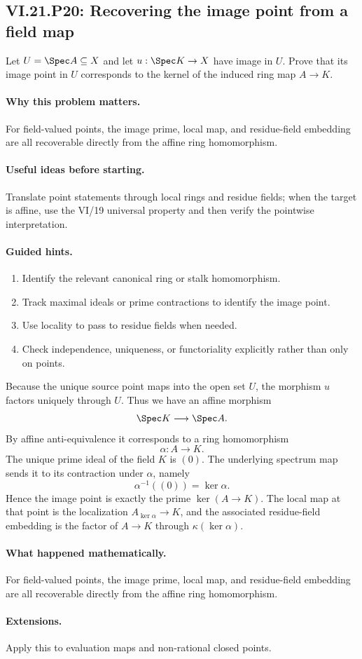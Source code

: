 \subsection*{VI.21.P20: Recovering the image point from a field map}
\begin{problem}\label{prob:vi21-p20}
Let $U=\Spec A\subseteq X$ and let $u:\Spec K\to X$ have image in $U$.  Prove that its image point in $U$ corresponds to the kernel of the induced ring map $A\to K$.
\end{problem}

\ifdefined\FullProblemDossiers
\paragraph{Why this problem matters.}
For field-valued points, the image prime, local map, and residue-field embedding are all recoverable directly from the affine ring homomorphism.

\paragraph{Useful ideas before starting.}
Translate point statements through local rings and residue fields; when the target is affine, use the VI/19 universal property and then verify the pointwise interpretation.

\paragraph{Guided hints.}
\begin{enumerate}
\item Identify the relevant canonical ring or stalk homomorphism.
\item Track maximal ideals or prime contractions to identify the image point.
\item Use locality to pass to residue fields when needed.
\item Check independence, uniqueness, or functoriality explicitly rather than only on points.
\end{enumerate}

\begin{solution}
Because the unique source point maps into the open set $U$, the morphism $u$ factors uniquely
through $U$.  Thus we have an affine morphism
\[
\Spec K\longrightarrow\Spec A.
\]
By affine anti-equivalence it corresponds to a ring homomorphism
\[
\alpha:A\longrightarrow K.
\]
The unique prime ideal of the field $K$ is $(0)$.  The underlying spectrum map sends it to its
contraction under $\alpha$, namely
\[
\alpha^{-1}((0))=\ker\alpha.
\]
Hence the image point is exactly the prime $\ker(A\to K)$.  The local map at that point is the
localization $A_{\ker\alpha}\to K$, and the associated residue-field embedding is the factor of
$A\to K$ through $\kappa(\ker\alpha)$.
\end{solution}

\paragraph{What happened mathematically.}
For field-valued points, the image prime, local map, and residue-field embedding are all recoverable directly from the affine ring homomorphism.

\paragraph{Extensions.}
Apply this to evaluation maps and non-rational closed points.
\fi
